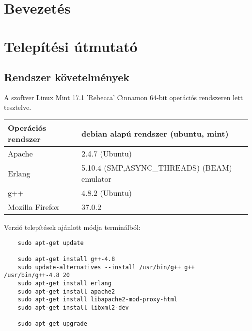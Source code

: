\begin{comment}
	A Felhasználói dokumentáció tartalmazza
	- a megoldott probléma rövid megfogalmazását,
	- a felhasznált módszerek rövid leírását,
	- a program használatához szükséges összes információt

	Magába foglalja a telepítési- (vagy üzemeltetési-) és a végfelhasználói leírást. Ezek
	meghatározott célközönséghez szólnak, könnyen és gyorsan kell, hogy eligazítsák a
	felhasználót a program használatában!

\end{comment}

\section{Bevezetés}
\section{Telepítési útmutató}
\subsection{Rendszer követelmények}
	A szoftver Linux Mint 17.1 'Rebecca' Cinnamon 64-bit operációs rendszeren lett tesztelve.
	\begin{center}
  	\begin{tabular}{| p{5cm} | p{10cm} |} 
  	\hline
        Operációs rendszer & debian alapú rendszer (ubuntu, mint)
    \\ \hline
        Apache & 2.4.7 (Ubuntu)
    \\ \hline
        Erlang & 5.10.4 (SMP,ASYNC\_THREADS) (BEAM) emulator 
    \\ \hline
        g++ & 4.8.2 (Ubuntu)
    \\ \hline
        Mozilla Firefox & 37.0.2
    \\ \hline
    
    \end{tabular}
    \end{center}

    Verzió telepítések ajánlott módja terminálból:
	\begin{verbatim}
	sudo apt-get update

	sudo apt-get install g++-4.8
	sudo update-alternatives --install /usr/bin/g++ g++ /usr/bin/g++-4.8 20
	sudo apt-get install erlang
	sudo apt-get install apache2
	sudo apt-get install libapache2-mod-proxy-html
	sudo apt-get install libxml2-dev

	sudo apt-get upgrade
	\end{verbatim}
